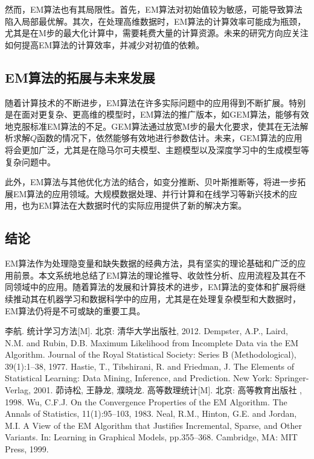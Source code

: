 \documentclass[a4paper,12pt]{ctexart} %
\begin{document}
然而，EM算法也有其局限性。首先，EM算法对初始值较为敏感，可能导致算法陷入局部最优解。其次，在处理高维数据时，EM算法的计算效率可能成为瓶颈，尤其是在M步的最大化计算中，需要耗费大量的计算资源。未来的研究方向应关注如何提高EM算法的计算效率，并减少对初值的依赖。

\subsection{EM算法的拓展与未来发展}

随着计算技术的不断进步，EM算法在许多实际问题中的应用得到不断扩展。特别是在面对更复杂、更高维的模型时，EM算法的推广版本，如GEM算法，能够有效地克服标准EM算法的不足。GEM算法通过放宽M步的最大化要求，使其在无法解析求解$Q$函数的情况下，依然能够有效地进行参数估计。未来，GEM算法的应用将会更加广泛，尤其是在隐马尔可夫模型、主题模型以及深度学习中的生成模型等复杂问题中。

此外，EM算法与其他优化方法的结合，如变分推断、贝叶斯推断等，将进一步拓展EM算法的应用领域。大规模数据处理、并行计算和在线学习等新兴技术的应用，也为EM算法在大数据时代的实际应用提供了新的解决方案。

\subsection{结论}

EM算法作为处理隐变量和缺失数据的经典方法，具有坚实的理论基础和广泛的应用前景。本文系统地总结了EM算法的理论推导、收敛性分析、应用流程及其在不同领域中的应用。随着算法的发展和计算技术的进步，EM算法的变体和扩展将继续推动其在机器学习和数据科学中的应用，尤其是在处理复杂模型和大数据时，EM算法仍将是不可或缺的重要工具。

\begin{thebibliography}{99}
     李航. 统计学习方法[M]. 北京: 清华大学出版社, 2012.
     Dempster, A.P., Laird, N.M. and Rubin, D.B. Maximum Likelihood from Incomplete Data via the EM Algorithm. Journal of the Royal Statistical Society: Series B (Methodological), 39(1):1--38, 1977.
     Hastie, T., Tibshirani, R. and Friedman, J. The Elements of Statistical Learning: Data Mining, Inference, and Prediction. New York: Springer-Verlag, 2001.
     茆诗松, 王静龙, 濮晓龙. 高等数理统计[M]. 北京: 高等教育出版社 , 1998.
     Wu, C.F.J. On the Convergence Properties of the EM Algorithm. The Annals of Statistics, 11(1):95--103, 1983.
     Neal, R.M., Hinton, G.E. and Jordan, M.I. A View of the EM Algorithm that Justifies Incremental, Sparse, and Other Variants. In: Learning in Graphical Models, pp.355--368. Cambridge, MA: MIT Press, 1999.
\end{thebibliography}
\newpage
\appendix
\end{document}
